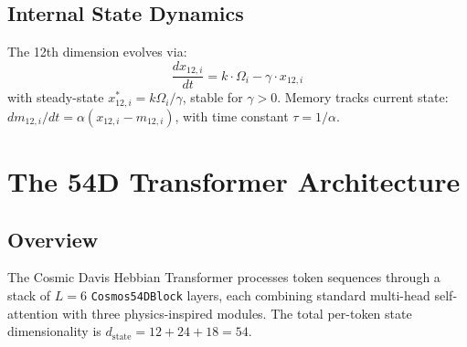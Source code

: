 \documentclass[11pt,a4paper]{article}
\begin{document}
\subsection{Internal State Dynamics}

The 12th dimension evolves via:
\begin{equation}
    \frac{dx_{12,i}}{dt} = k \cdot \Omega_i - \gamma \cdot x_{12,i}
    \label{eq:x12}
\end{equation}
with steady-state $x_{12,i}^* = k\Omega_i / \gamma$, stable for $\gamma > 0$. Memory tracks current state: $dm_{12,i}/dt = \alpha(x_{12,i} - m_{12,i})$, with time constant $\tau = 1/\alpha$.

\section{The 54D Transformer Architecture}
\label{sec:architecture}

\subsection{Overview}

The Cosmic Davis Hebbian Transformer processes token sequences through a stack of $L=6$ \texttt{Cosmos54DBlock} layers, each combining standard multi-head self-attention with three physics-inspired modules. The total per-token state dimensionality is $d_{\text{state}} = 12 + 24 + 18 = 54$.
\end{document}
